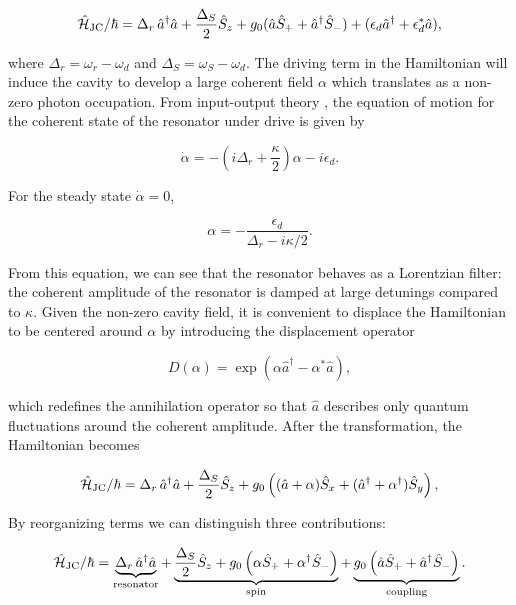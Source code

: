 \begin{equation}
    \hat{\mathcal{H}}_{\text{JC}} / \hbar = \Delta_r\,\hat{a}^\dagger \hat{a} +  \frac{\Delta_S}{2} \hat{S}_z + g_{0} ( \hat{a}\hat{S}_{+} + \hat{a}^{\dagger}\hat{S}_{-} ) + (\epsilon_d \hat{a}^\dagger + \epsilon_d^* \hat{a}),
\end{equation}

\noindent where $\Delta_r = \omega_r - \omega_d$ and $\Delta_S = \omega_S - \omega_d$. The driving term in the Hamiltonian will induce the cavity to develop a large coherent field $\alpha$ which translates as a non-zero photon occupation. From input-output theory , the equation of motion for the coherent state of the resonator under drive is given by  

\begin{equation}
    \dot{\alpha} = - \left( i\Delta_r + \frac{\kappa}{2}\right)\alpha - i\epsilon_d.
\end{equation}

For the steady state $\dot{\alpha}=0$, 

\begin{equation}
    \alpha = -\frac{\epsilon_d}{\Delta_r- i\kappa/2}.
\end{equation}

From this equation, we can see that the resonator behaves as a Lorentzian filter: the coherent amplitude of the resonator is damped at large detunings compared to $\kappa$. Given the non-zero cavity field, it is convenient to displace the Hamiltonian to be centered around $\alpha$ by introducing the displacement operator 

\begin{equation}
D(\alpha) = \exp\!\left(\alpha \hat{a}^\dagger - \alpha^* \hat{a}\right),
\end{equation}

which redefines the annihilation operator so that $\hat{a}$ describes only quantum fluctuations around the coherent amplitude. After the transformation, the Hamiltonian becomes


\begin{equation}
    \hat{\mathcal{H}}_{\text{JC}} / \hbar = \Delta_r\,\hat{a}^\dagger \hat{a} +  \frac{\Delta_S}{2} \hat{S}_z + g_{0} \left( (\hat{a} + \alpha)\hat{S}_{x} + (\hat{a}^{\dagger} + \alpha^\dagger)\hat{S}_{y} \right),
\end{equation}

By reorganizing terms we can distinguish three contributions:

\begin{align}
\begin{split}
    \hat{\mathcal{H}}_{\text{JC}} / \hbar = \underbrace{\Delta_r\,\hat{a}^\dagger \hat{a}}_\text{resonator} + \underbrace{\frac{\Delta_S}{2} \hat{S}_z + g_{0} \left( \alpha\hat{S}_{+} + \alpha^\dagger\hat{S}_{-} \right)}_\text{spin} + \underbrace{g_{0} \left( \hat{a}\hat{S}_{+} + \hat{a}^{\dagger}\hat{S}_{-} \right)}_\text{coupling}.
\end{split}
\end{align}

